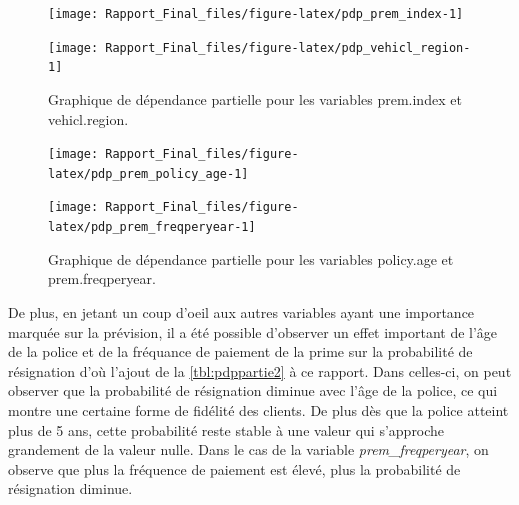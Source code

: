\documentclass[]{article}
\begin{document}
\begin{figure}
\centering
\begin{minipage}{0.48\linewidth}

\begin{center}\texttt{[image: Rapport\_Final\_files/figure-latex/pdp\_prem\_index-1]} \end{center}
\end{minipage}
\hfill
\begin{minipage}{0.48\linewidth}

\begin{center}\texttt{[image: Rapport\_Final\_files/figure-latex/pdp\_vehicl\_region-1]} \end{center}
\end{minipage}
\caption{Graphique de dépendance partielle pour les variables prem.index et vehicl.region.}
\label{tbl:pdppartie1}
\end{figure}

\begin{figure}
\centering
\begin{minipage}{0.48\linewidth}

\begin{center}\texttt{[image: Rapport\_Final\_files/figure-latex/pdp\_prem\_policy\_age-1]} \end{center}
\end{minipage}
\hfill
\begin{minipage}{0.48\linewidth}

\begin{center}\texttt{[image: Rapport\_Final\_files/figure-latex/pdp\_prem\_freqperyear-1]} \end{center}
\end{minipage}
\caption{Graphique de dépendance partielle pour les variables policy.age et prem.freqperyear.}
\label{tbl:pdppartie2}
\end{figure}

De plus, en jetant un coup d'oeil aux autres variables ayant une
importance marquée sur la prévision, il a été possible d'observer un
effet important de l'âge de la police et de la fréquance de paiement de
la prime sur la probabilité de résignation d'où l'ajout de la
\autoref{tbl:pdppartie2} à ce rapport. Dans celles-ci, on peut observer
que la probabilité de résignation diminue avec l'âge de la police, ce
qui montre une certaine forme de fidélité des clients. De plus dès que
la police atteint plus de 5 ans, cette probabilité reste stable à une
valeur qui s'approche grandement de la valeur nulle. Dans le cas de la
variable \emph{prem\_freqperyear}, on observe que plus la fréquence de
paiement est élevé, plus la probabilité de résignation diminue.
\end{document}
